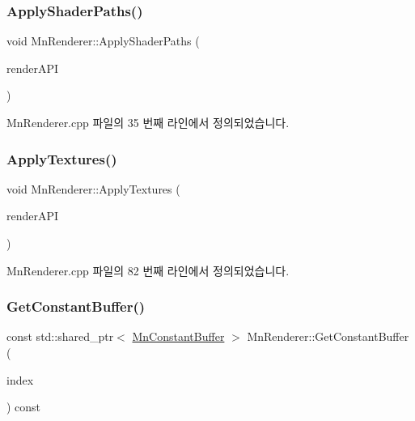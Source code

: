 \subsubsection{\texorpdfstring{Apply\+Shader\+Paths()}{ApplyShaderPaths()}}
{\footnotesize\ttfamily void Mn\+Renderer\+::\+Apply\+Shader\+Paths (\begin{DoxyParamCaption}\item[{\hyperlink{class_m_n_l_1_1_mn_render_a_p_i}{Mn\+Render\+A\+PI} \&}]{render\+A\+PI }\end{DoxyParamCaption})}



Mn\+Renderer.\+cpp 파일의 35 번째 라인에서 정의되었습니다.

\mbox{\label{class_m_n_l_1_1_mn_renderer_a8a1dbdc2abb81d46c786bde59305455b}} 
\subsubsection{\texorpdfstring{Apply\+Textures()}{ApplyTextures()}}
{\footnotesize\ttfamily void Mn\+Renderer\+::\+Apply\+Textures (\begin{DoxyParamCaption}\item[{\hyperlink{class_m_n_l_1_1_mn_render_a_p_i}{Mn\+Render\+A\+PI} \&}]{render\+A\+PI }\end{DoxyParamCaption})}



Mn\+Renderer.\+cpp 파일의 82 번째 라인에서 정의되었습니다.

\mbox{\label{class_m_n_l_1_1_mn_renderer_af2acf082128e501b64645c3cb19fbe32}} 
\subsubsection{\texorpdfstring{Get\+Constant\+Buffer()}{GetConstantBuffer()}}
{\footnotesize\ttfamily const std\+::shared\+\_\+ptr$<$ \hyperlink{class_m_n_l_1_1_mn_constant_buffer}{Mn\+Constant\+Buffer} $>$ Mn\+Renderer\+::\+Get\+Constant\+Buffer (\begin{DoxyParamCaption}\item[{U\+I\+NT}]{index }\end{DoxyParamCaption}) const}



